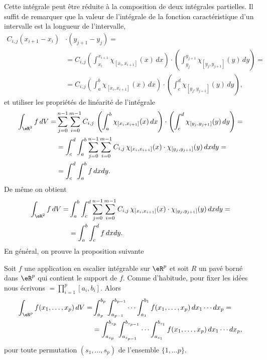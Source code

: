 Cette intégrale peut être réduite à la composition de deux intégrales partielles. Il suffit de remarquer que la valeur de l'intégrale de la fonction caractéristique d'un intervalle est la longueur de l'intervalle, 
\begin{equation}
  \begin{aligned}
    C_{i,j}(x_{i+1}-x_i)&\cdot(y_{j+1}-y_j)=\\
&=C_{i,j}\left(\int_{x_i}^{x_{i+1}}\chi_{[x_{i},x_{i+1}]}(x)\, dx \right)\cdot \left(\int_{y_j}^{y_{j+1}}\chi_{[y_{ j},y_{ j+1}]}(y)\, dy \right)=\\
&=C_{i,j}\left(\int_{a}^{b}\chi_{[x_{i},x_{i+1}]}(x)\, dx \right)\cdot \left(\int_{c}^{d}\chi_{[y_{ j},y_{ j+1}]}(y)\, dy \right),
  \end{aligned}
\end{equation}
et utiliser les propriétés de linéarité de l'intégrale
\begin{equation}
  \begin{aligned}
   \int_{\eR^2}f \,dV =& \sum_{j=0}^{n-1}\sum_{i=0}^{m-1}C_{i,j}\,\left(\int_{a}^{b}\chi_{[x_{i},x_{i+1}]}(x)\, dx \right)\cdot \left(\int_{c}^{d}\chi_{[y_{ j},y_{ j+1}]}(y)\, dy \right)=\\
&=\int_{c}^{d}\int_{a}^{b}\sum_{j=0}^{n-1}\sum_{i=0}^{m-1}C_{i,j}\,\chi_{[x_{i},x_{i+1}]}(x)\cdot \chi_{[y_{ j},y_{ j+1}]}(y)\, dx dy=\\
&=\int_{c}^{d}\int_{a}^{b} f\, dx dy.  
  \end{aligned}
\end{equation}
De même on obtient
\begin{equation}
  \begin{aligned}
   \int_{\eR^2}f \,dV =&\int_{a}^{b}\int_{c}^{d}\sum_{j=0}^{n-1}\sum_{i=0}^{m-1}C_{i,j}\,\chi_{[x_{i},x_{i+1}]}(x)\cdot \chi_{[y_{ j},y_{ j+1}]}(y)\, dx dy=\\
&=\int_{a}^{b}\int_{c}^{d} f\, dx dy.  
  \end{aligned}
\end{equation}
En général, on prouve la proposition suivante
\begin{proposition}
 Soit $f$ une application en escalier intégrable sur $\eR^p$ et soit $R$ un pavé borné dans $\eR^p$ qui contient le support de $f$. Comme d'habitude, pour fixer les idées nous écrivons $=\prod_{i=1}^p[a_i,b_i]$. Alors
 \begin{equation}
   \begin{aligned}
     \int_{\eR^p}f(x_1,\ldots, x_p) \, dV =& \int_{a_p}^{b_p}\int_{a_{p-1}}^{b_{p-1}}\cdots\int_{a_1}^{b_1} f(x_1,\ldots, x_p) \, dx_1\cdots dx_p=\\
&=\int_{a_{s_p}}^{b_{s_p}}\int_{a_{s_{p-1}}}^{b_{s_{p-1}}}\cdots\int_{a_{s_1}}^{b_{s_1}} f(x_1,\ldots, x_p) \, dx_1\cdots dx_p,
   \end{aligned}
 \end{equation}
pour toute permutation $(s_1,\ldots,s_p)$ de l'ensemble $\{1,\ldots p\}$.
\end{proposition}

